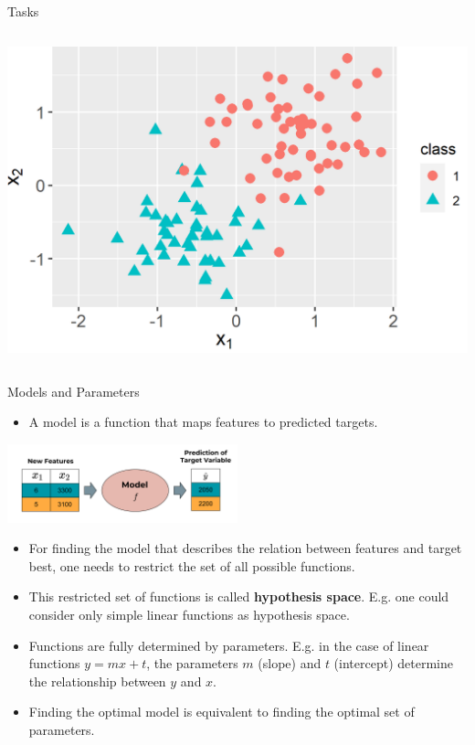 \documentclass[11pt,compress,t,notes=noshow, xcolor=table]{beamer}
\begin{document}
\begin{vbframe}{Tasks}
\begin{columns}
\begin{column}{0.4\textwidth}
  \begin{center}
    \includegraphics[width=\textwidth]{figure/ml-basics-supervised-classif-task.png} 
  \end{center}
\end{column}    
\end{columns}    

\end{vbframe}


\begin{vbframe}{Models and Parameters}
\small 
\begin{itemize}
    \item A model is a function that maps features to predicted targets.
\end{itemize}

\begin{center}
  \includegraphics[width = 0.5\textwidth]{figure_man/the_model_web.png} 
\end{center}

\small
\begin{itemize}
\item  For finding the model that describes the relation between features and target best, one needs to restrict the set of all possible functions. 
\item This restricted set of functions is called \textbf{hypothesis space}. E.g. one could consider only simple linear functions as hypothesis space.
\item Functions are fully determined by parameters. E.g. in the case of linear functions $y = mx + t$, the parameters $m$ (slope) and $t$ (intercept) determine the relationship between $y$ and $x$.
\item Finding the optimal model is equivalent to finding the optimal set of parameters.
\end{itemize}

\end{vbframe}
\end{document}
